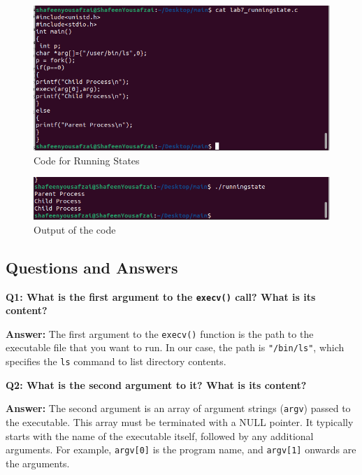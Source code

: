 \documentclass[12pt]{article}
\begin{document}
\begin{figure}[h]
    \centering
    \includegraphics[width=\textwidth]{Screenshot from 2024-10-04 04-14-27.png} %
    \caption{Code for Running States}
    \label{fig:running_states_code}
\end{figure}

\begin{figure}[H]
    \centering
    \includegraphics[width=\textwidth]{Screenshot from 2024-10-04 04-14-38.png} %
    \caption{Output of the code}
    \label{fig:waiting_states_solution}
\end{figure}

\subsection*{Questions and Answers}

\textbf{Q1: What is the first argument to the \texttt{execv()} call? What is its content?}

\textbf{Answer:} The first argument to the \texttt{execv()} function is the path to the executable file that you want to run. In our case, the path is \texttt{"/bin/ls"}, which specifies the \texttt{ls} command to list directory contents.

\bigskip

\textbf{Q2: What is the second argument to it? What is its content?}

\textbf{Answer:} The second argument is an array of argument strings (\texttt{argv}) passed to the executable. This array must be terminated with a NULL pointer. It typically starts with the name of the executable itself, followed by any additional arguments. For example, \texttt{argv[0]} is the program name, and \texttt{argv[1]} onwards are the arguments.
\end{document}
